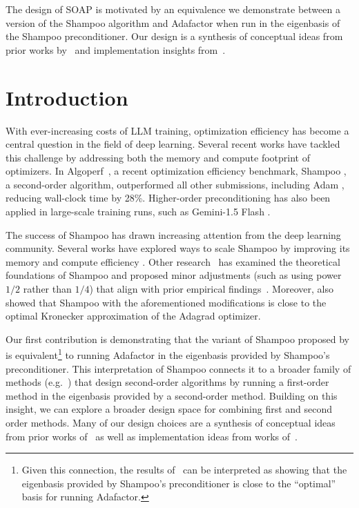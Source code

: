 \documentclass{article} %
\begin{document}
The design of SOAP is motivated by an equivalence we demonstrate between a version of the Shampoo algorithm and Adafactor when run in the eigenbasis of the Shampoo preconditioner. Our design is a synthesis of conceptual ideas from prior works by~\citet{ekfac,anil2020scalable,whyshampoo} and implementation insights from~\citet{4bitshampoo,galore}. 
\fi

\section{Introduction}

With ever-increasing costs of LLM training, optimization efficiency has become a central question in the field of deep learning. Several recent works have tackled this challenge by addressing both the memory \citep{galore, 4bitshampoo} and compute \citep{anil2020scalable} footprint of optimizers. In Algoperf~\citep{dahl2023benchmarking}, a recent optimization efficiency benchmark, Shampoo \citep{gupta2018shampoo}, a second-order algorithm, outperformed all other submissions, including Adam \citep{adam}, reducing wall-clock time by 28\%. Higher-order preconditioning has also been applied in large-scale training runs, such as Gemini-1.5 Flash \citep{gemini15}.

The success of Shampoo has drawn increasing attention from the deep learning community. Several works have explored ways to scale Shampoo by improving its memory and compute efficiency \citep{4bitshampoo, anil2020scalable, distributedshampoo}. Other research~\citep{whyshampoo} has examined the theoretical foundations of Shampoo and proposed minor adjustments (such as using power $1/2$ rather than $1/4$) that align with prior empirical findings~\citep{anil2020scalable}. Moreover, \citet{whyshampoo} also showed that Shampoo with the aforementioned modifications is close to the optimal Kronecker approximation of the Adagrad \citep{adagrad} optimizer.

Our first contribution is demonstrating that the variant of Shampoo proposed by \citet{whyshampoo} is equivalent\footnote{Given this connection, the results of~\citet{whyshampoo} can be interpreted as showing that the eigenbasis provided by Shampoo's preconditioner is close to the ``optimal'' basis for running Adafactor.} to running Adafactor \citep{adafactor, zhai} in the eigenbasis provided by Shampoo's preconditioner. This interpretation of Shampoo connects it to a broader family of methods (e.g.~\citep{ekfac}) that design second-order algorithms by running a first-order method in the eigenbasis provided by a second-order method. Building on this insight, we can explore a broader design space for combining first and second order methods. Many of our design choices are a synthesis of conceptual ideas from prior works of~\citet{ekfac,anil2020scalable,whyshampoo} as well as implementation ideas from works of~\citet{4bitshampoo,galore}.
\end{document}
